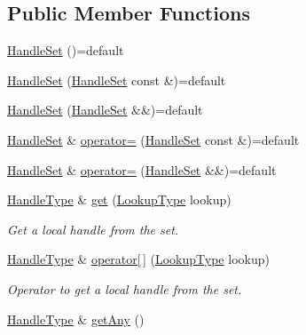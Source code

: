 \subsection*{Public Member Functions}
\begin{DoxyCompactItemize}
\item 
\hyperlink{structvt_1_1rdma_1_1_handle_set_a61565fe70c627c3fb0f68b3585610587}{Handle\+Set} ()=default
\item 
\hyperlink{structvt_1_1rdma_1_1_handle_set_a831411511aa162e1539faa57552a2915}{Handle\+Set} (\hyperlink{structvt_1_1rdma_1_1_handle_set}{Handle\+Set} const \&)=default
\item 
\hyperlink{structvt_1_1rdma_1_1_handle_set_ac64a7c08446a8054ae533630dab04672}{Handle\+Set} (\hyperlink{structvt_1_1rdma_1_1_handle_set}{Handle\+Set} \&\&)=default
\item 
\hyperlink{structvt_1_1rdma_1_1_handle_set}{Handle\+Set} \& \hyperlink{structvt_1_1rdma_1_1_handle_set_a9bd23e3b2d2f5d4f7ad5b8dde06da2f8}{operator=} (\hyperlink{structvt_1_1rdma_1_1_handle_set}{Handle\+Set} const \&)=default
\item 
\hyperlink{structvt_1_1rdma_1_1_handle_set}{Handle\+Set} \& \hyperlink{structvt_1_1rdma_1_1_handle_set_afbb15c0776ef7ace101025f2ae151ecd}{operator=} (\hyperlink{structvt_1_1rdma_1_1_handle_set}{Handle\+Set} \&\&)=default
\item 
\hyperlink{structvt_1_1rdma_1_1_handle_set_ab3a698ee86bae503dfa84617205b2dd9}{Handle\+Type} \& \hyperlink{structvt_1_1rdma_1_1_handle_set_a7142722ee5cb3dfaece2f4296d8fcf8d}{get} (\hyperlink{structvt_1_1rdma_1_1_handle_set_a81d333ec397f0becb9fe692e53145441}{Lookup\+Type} lookup)
\begin{DoxyCompactList}\small\item\em Get a local handle from the set. \end{DoxyCompactList}\item 
\hyperlink{structvt_1_1rdma_1_1_handle_set_ab3a698ee86bae503dfa84617205b2dd9}{Handle\+Type} \& \hyperlink{structvt_1_1rdma_1_1_handle_set_ab435257f5fa0f6af282e2775eb41c8c7}{operator\mbox{[}$\,$\mbox{]}} (\hyperlink{structvt_1_1rdma_1_1_handle_set_a81d333ec397f0becb9fe692e53145441}{Lookup\+Type} lookup)
\begin{DoxyCompactList}\small\item\em Operator to get a local handle from the set. \end{DoxyCompactList}\item 
\hyperlink{structvt_1_1rdma_1_1_handle_set_ab3a698ee86bae503dfa84617205b2dd9}{Handle\+Type} \& \hyperlink{structvt_1_1rdma_1_1_handle_set_a9b83c1e278ad60647007350339443643}{get\+Any} ()

\end{DoxyCompactItemize}
